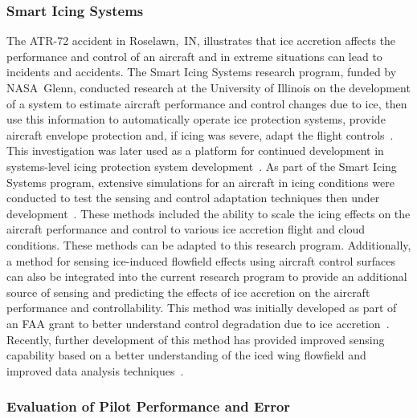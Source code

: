 \documentclass[letter,onecolumn,12pt]{aiaa-tc}
\begin{document}
\subsubsection{Smart Icing Systems}

The ATR-72 accident in Roselawn,~IN, illustrates that ice accretion affects the performance and control of an aircraft and in extreme situations can lead to incidents and accidents. The Smart Icing Systems research program, funded by NASA~Glenn, conducted research at the University of Illinois on the development of a system to estimate aircraft performance and control changes due to ice, then use this information to automatically operate ice protection systems, provide aircraft envelope protection and, if icing was severe, adapt the flight controls~\cite{ICING_Bragg03}. This investigation was later used as a platform for continued development in systems-level icing protection system development~\cite{ICING_Gingras09}. As part of the Smart Icing Systems program, extensive  simulations for an aircraft in icing conditions were conducted to test the sensing and control adaptation techniques then under development~\cite{ICING_Bragg02}. These methods included the ability to scale the icing effects on the aircraft performance and control to various ice accretion flight and cloud conditions. These methods can be adapted to this research program. Additionally, a method for sensing ice-induced flowfield effects using aircraft control surfaces can also be integrated into the current research program to provide an additional source of sensing and predicting the effects of ice accretion on the aircraft performance and controllability. This method was initially developed as part of an FAA grant to better understand control degradation due to ice accretion~\cite{gurbacki}. Recently, further development of this method has provided improved sensing capability based on a better understanding of the iced wing flowfield and improved data analysis techniques~\cite{bragg2011_stall}.


\subsubsection{Evaluation of Pilot Performance and Error}
\end{document}

